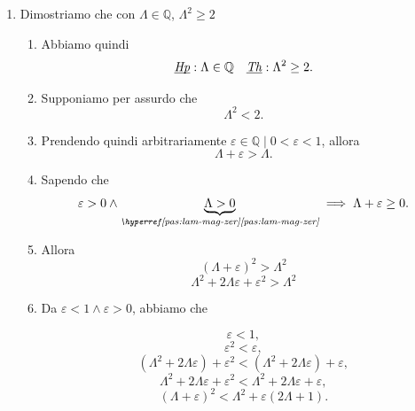 \begin{enumerate}
\begin{demonstration}
\begin{enumerate}[label=(\roman*)]
\begin{enumerate}[label=\arabic*.]
                \item $\Lambda$ non è un maggiorante per $\mathbb{A}$, dunque viene violata la definizione precedente
                    secondo cui $\Lambda := \sup\mathbb{A}$, che richiederebbe che $\Lambda$ sia un maggiorante per $\mathbb{A}$.

                \item La negazione della tesi porta a una contraddizione.
                \item La tesi deve essere necessariamente vera.

            \end{enumerate}
            \qed

            \item \label{pas:due-low-bou} Dimostriamo che con $\Lambda\in\mathbb{Q}$, $\Lambda^2 \geq 2$

            \begin{enumerate}[label=\arabic*.]
                \item Abbiamo quindi
                \[ \underbar{\textit{Hp}}: \Lambda\in\mathbb{Q} \quad \underbar{\textit{Th}}: \Lambda^2 \geq 2.\]

                \item Supponiamo per assurdo che
                \[ \Lambda^2 < 2.\]

                \item \label{pas:con-eps} Prendendo quindi arbitrariamente $\varepsilon\in\mathbb{Q} \mid 0 < \varepsilon < 1$, allora
                \[ \Lambda + \varepsilon > \Lambda .\]

                \item Sapendo che 
                \[ \varepsilon > 0 \land  \underbrace{\Lambda > 0}_{\pasref{pas:lam-mag-zer}} \implies \Lambda+\varepsilon\geq0.\]
                \item \label{pas:lam-rel-eps}Allora
                \[ (\Lambda + \varepsilon)^2 > \Lambda^2 \]
                \[ \Lambda^2 + 2\Lambda\varepsilon + \varepsilon^2 > \Lambda^2 \]

                \item \label{pas:lam-con-eps} Da $\varepsilon < 1 \land  \varepsilon > 0$, abbiamo che
                
                \[ \varepsilon < 1, \]
                \[ \varepsilon ^2 < \varepsilon, \]
                \[(\Lambda^2 + 2\Lambda\varepsilon)+\varepsilon^2 < (\Lambda^2 + 2\Lambda\varepsilon) + \varepsilon, \]
                \[\Lambda^2 + 2\Lambda\varepsilon+\varepsilon^2 < \Lambda^2 + 2\Lambda\varepsilon + \varepsilon, \]
                \[(\Lambda+\varepsilon)^2 < \Lambda^2 + \varepsilon \left(2\Lambda + 1\right). \]


\end{enumerate}
\end{enumerate}
\end{demonstration}
\end{enumerate}
